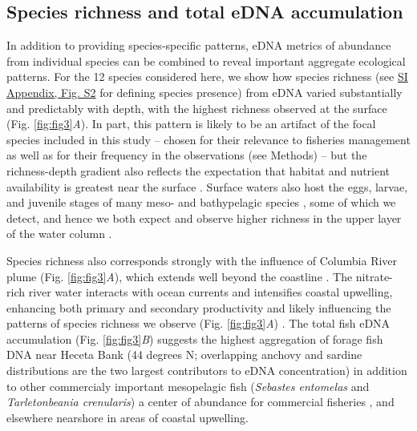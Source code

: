 \documentclass{article}
\begin{document}
\subsection*{Species richness and total eDNA accumulation}
In addition to providing species-specific patterns, eDNA metrics of abundance from individual species can be combined to reveal important aggregate ecological patterns. For the 12 species considered here, we show how species richness (see \href{SI_Appendix.pdf}{SI Appendix, Fig. S2} for defining species presence) from eDNA varied substantially and predictably with depth, with the highest richness observed at the surface (Fig. \ref{fig:fig3}\textit{A}). In part, this pattern is likely to be an artifact of the focal species included in this study -- chosen for their relevance to fisheries management as well as for their frequency in the observations (see Methods) -- but the richness-depth gradient also reflects the expectation that habitat and nutrient availability is greatest near the surface \cite{smith2002,hickey2005}. Surface waters also host the eggs, larvae, and juvenile stages of many meso- and bathypelagic species \cite{parnel2008}, some of which we detect, and hence we both expect and observe higher richness in the upper layer of the water column \cite{kim2011}.

Species richness also corresponds strongly with the influence of Columbia River plume (Fig. \ref{fig:fig3}\textit{A}), which extends well beyond the coastline \cite{hickey2003}. The nitrate-rich river water interacts with ocean currents and intensifies coastal upwelling, enhancing both primary and secondary productivity \cite{hickey2010} and likely influencing the patterns of species richness we observe (Fig. \ref{fig:fig3}\textit{A}) \cite{tolimieri2015}. The total fish eDNA accumulation (Fig. \ref{fig:fig3}\textit{B}) suggests the highest aggregation of forage fish DNA near Heceta Bank (44 degrees N; overlapping anchovy and sardine distributions are the two largest contributors to eDNA concentration) in addition to other commercialy important mesopelagic fish (\textit{Sebastes entomelas} and \textit{Tarletonbeania crenularis}) a center of abundance for commercial fisheries \cite{bosley2014,Tissot2008TwentyYO}, and elsewhere nearshore in areas of coastal upwelling.
\end{document}
